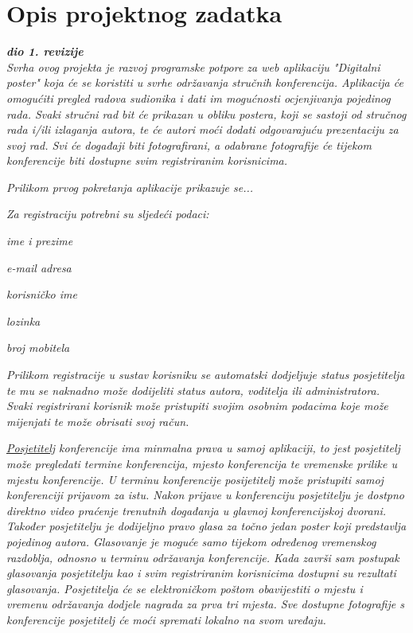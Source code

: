 \chapter{Opis projektnog zadatka}
		
		\textbf{\textit{dio 1. revizije}}\\
		
		\textit{Svrha ovog projekta je razvoj programske potpore za web aplikaciju "Digitalni poster" koja će se koristiti u svrhe održavanja stručnih konferencija. Aplikacija će omogućiti pregled radova sudionika i dati im mogućnosti ocjenjivanja pojedinog rada. Svaki stručni rad bit će prikazan u obliku postera, koji se sastoji od stručnog rada i/ili izlaganja autora, te će autori moći dodati odgovarajuću prezentaciju za svoj rad. Svi će događaji biti fotografirani, a odabrane fotografije će tijekom konferencije biti dostupne svim registriranim korisnicima.}

		\textit{Prilikom prvog pokretanja aplikacije prikazuje se...}

		\textit{Za registraciju potrebni su sljedeći podaci:}

		\begin{packed_item}
			\item \textit{ime i prezime}
			\item \textit{e-mail adresa}
			\item \textit{korisničko ime}
			\item \textit{lozinka}
			\item \textit{broj mobitela}
		\end{packed_item}
		\textit{Prilikom registracije u sustav korisniku se automatski dodjeljuje status posjetitelja te mu se naknadno može dodijeliti status autora, voditelja ili administratora. Svaki registrirani korisnik može pristupiti svojim osobnim podacima koje može mijenjati te može obrisati svoj račun.}

		\textit{\underline{Posjetitelj} konferencije ima minmalna prava u samoj aplikaciji, to jest posjetitelj može pregledati termine konferencija, mjesto konferencija te vremenske prilike u mjestu konferencije. U terminu konferencije posijetitelj može pristupiti samoj konferenciji prijavom za istu. Nakon prijave u konferenciju posjetitelju je dostpno direktno video praćenje trenutnih događanja u glavnoj konferencijskoj dvorani. Također posjetitelju je dodijeljno pravo glasa za točno jedan poster koji predstavlja pojedinog autora. Glasovanje je moguće samo tijekom određenog vremenskog razdoblja, odnosno u terminu održavanja konferencije. Kada završi sam postupak glasovanja posjetitelju kao i svim registriranim korisnicima dostupni su rezultati glasovanja. Posjetitelja će se elektroničkom poštom obavijestiti o mjestu i vremenu održavanja dodjele nagrada za prva tri mjesta. Sve dostupne fotografije s konferencije posjetitelj će moći spremati lokalno na svom uređaju.}

